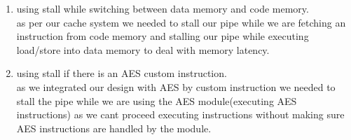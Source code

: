 \documentclass[../main.tex]{subfiles}
\begin{document}
\begin{enumerate}
\begin{enumerate}
    \item using stall while switching between data memory and code memory.\\
        as per our cache system we needed to stall our pipe while we are fetching an instruction from code  memory and stalling our pipe while executing load/store into data memory  to deal with memory latency.

    \item using stall if there is an AES custom instruction.\\
      as we integrated our design with AES by custom instruction we needed to stall the pipe while we are using the AES module(executing AES instructions) as we cant proceed executing instructions without making sure AES instructions are handled by the module. 

\end{enumerate}


\end{enumerate}
\end{document}
